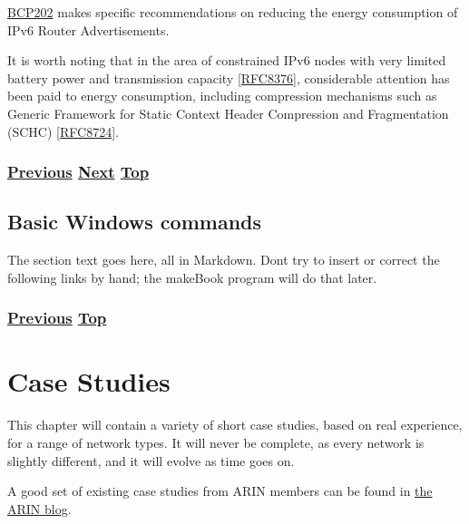 \documentclass[
]{article}
\begin{document}
\href{https://www.rfc-editor.org/info/bcp202}{BCP202} makes specific
recommendations on reducing the energy consumption of IPv6 Router
Advertisements.

It is worth noting that in the area of constrained IPv6 nodes with very
limited battery power and transmission capacity
{[}\href{https://www.rfc-editor.org/info/rfc8376}{RFC8376}{]},
considerable attention has been paid to energy consumption, including
compression mechanisms such as Generic Framework for Static Context
Header Compression and Fragmentation (SCHC)
{[}\href{https://www.rfc-editor.org/info/rfc8724}{RFC8724}{]}.

\subsubsection{\texorpdfstring{\hyperref[multihoming]{Previous}
\hyperref[basic-windows-commands]{Next}
\hyperref[management-and-operations]{Top}}{Previous Next Top}}\label{previous-next-top-27}

\pagebreak

\subsection{Basic Windows commands}\label{basic-windows-commands}

The section text goes here, all in Markdown. Don\textquotesingle t try
to insert or correct the following links by hand; the makeBook program
will do that later.

\subsubsection{\texorpdfstring{\hyperref[energy-consumption]{Previous}
\hyperref[management-and-operations]{Top}}{Previous Top}}\label{previous-top-4}

\pagebreak

\section{Case Studies}\label{case-studies}

This chapter will contain a variety of short case studies, based on real
experience, for a range of network types. It will never be complete, as
every network is slightly different, and it will evolve as time goes on.

A good set of existing case studies from ARIN members can be found in
\href{https://www.arin.net/blog/ipv6/}{the ARIN blog}.
\end{document}
